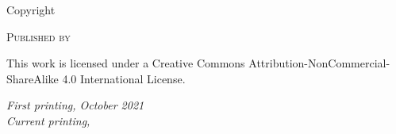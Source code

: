\makeatletter
\newpage
{}
\thispagestyle{empty}
\null
\vfill
\begin{fullwidth}

Copyright \textcopyright \the\year\ \@author

\par\textsc{Published by \@publishers}

\par This work is licensed under a Creative Commons Attribution-NonCommercial-ShareAlike 4.0 International License.

\par{\textit{First printing, October 2021}\\[1pt]
\textit{Current printing, \Month \ \the\year}}

\end{fullwidth}
\restoregeometry
\makeatother
